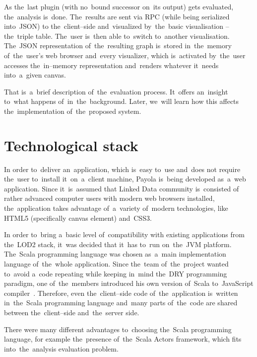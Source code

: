 As the~last plugin (with no~bound successor on~its output) gets evaluated, the~analysis is~done. The~results are sent via RPC (while being serialized into~JSON) 
to the~client--side and~visualized by~the~basic visualisation -- the~triple 
table. The~user is~then able to~switch to~another visualisation. The~JSON 
representation of~the~resulting graph is~stored in~the~memory of~the~user's web 
browser and~every visualizer, which is~activated by~the~user accesses the~in--memory representation and~renders whatever it~needs into~a~given canvas.

That is~a~brief description of~the~evaluation process. It~offers an~insight
to~what happens of~in~the~background. Later, we~will learn how this affects 
the~implementation of~the~proposed system.

\section{Technological stack}
In order to~deliver an~application, which is~easy to~use and~does not require 
the~user to~install it~on~a~client machine, Payola is~being developed as~a~web
application. Since it~is~assumed that Linked Data community is~consisted of
rather advanced computer users with modern web browsers installed, the~application 
takes advantage of~a~variety of~modern technologies, like HTML5 (specifically
canvas element) and~CSS3.

In order to~bring a~basic level of~compatibility with existing applications from 
the~LOD2 stack, it~was decided that it~has to~run on~the~JVM platform. The~Scala programming language was chosen as~a~main implementation language of~the~whole application. Since the~team of~the~project wanted to~avoid a~code repeating 
while keeping in~mind the~DRY programming paradigm, one of~the~members 
introduced his own version of~Scala to~JavaScript compiler~\cite{s2js}. Therefore, even the~client--side code of~the~application is~written in~the~Scala programming language 
and~many parts of~the~code are shared between the~client--side and~the~server 
side.

There were many different advantages to~choosing the~Scala programming language, 
for example the~presence of~the~Scala Actors framework, which fits into~the~analysis evaluation problem.

